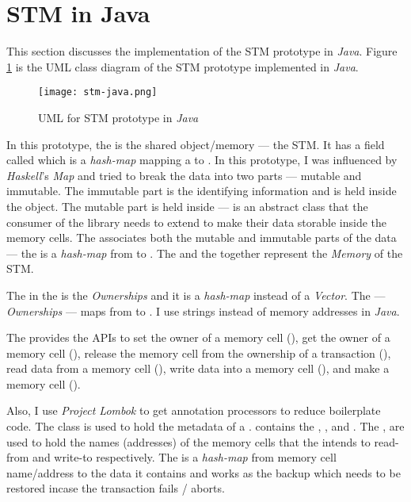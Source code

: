 \documentclass[../main]{subfiles}
\begin{document}
  \section{STM in Java}

  \par
  This section discusses the implementation of the STM prototype in {\em Java}. Figure \ref{fig:stm-java} is the UML class diagram of the STM prototype implemented in {\em Java}.

  \begin{figure}[h]
    \texttt{[image: stm-java.png]}
    \caption{UML for STM prototype in {\em Java}}
    \label{fig:stm-java}
  \end{figure}

  \par
  In this prototype, the  is the shared object/memory --- the STM. It has a field called  which is a {\em hash-map} mapping a  to . In this prototype, I was influenced by {\em Haskell}'s {\em Map} and tried to break the data into two parts --- mutable and immutable. The immutable part is the identifying information and is held inside the  object. The mutable part is held inside  ---  is an abstract class that the consumer of the library needs to extend to make their data storable inside the memory cells. The  associates both the mutable and immutable parts of the data --- the  is a {\em hash-map} from  to . The  and the  together represent the {\em Memory} of the STM. \par

  The  in the  is the {\em Ownerships} and it is a {\em hash-map} instead of a {\em Vector}. The  --- {\em Ownerships} --- maps from  to . I use strings instead of memory addresses in {\em Java}. \par 
  
  The  provides the APIs to set the owner of a memory cell (), get the owner of a memory cell (), release the memory cell from the ownership of a transaction (), read data from a memory cell (), write data into a memory cell (), and make a memory cell (). \par

  Also, I use {\em Project Lombok} to get annotation processors to reduce boilerplate code. The class  is used to hold the metadata of a .  contains the , , and . The ,  are used to hold the names (addresses) of the memory cells that the  intends to read-from and write-to respectively. The  is a {\em hash-map} from memory cell name/address to the data it contains and works as the backup which needs to be restored incase the transaction fails / aborts. \par
\end{document}
